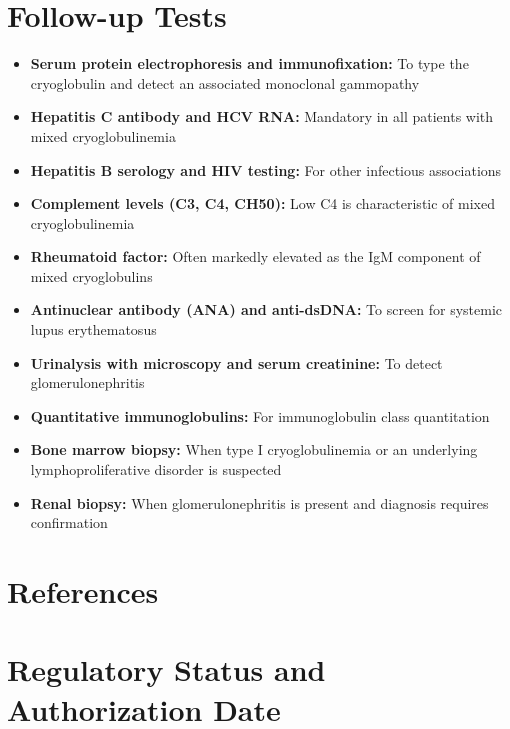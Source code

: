 \section*{Follow-up Tests}
\begin{itemize}
  \item \textbf{Serum protein electrophoresis and immunofixation:} To type the cryoglobulin and detect an associated monoclonal gammopathy
  \item \textbf{Hepatitis C antibody and HCV RNA:} Mandatory in all patients with mixed cryoglobulinemia
  \item \textbf{Hepatitis B serology and HIV testing:} For other infectious associations
  \item \textbf{Complement levels (C3, C4, CH50):} Low C4 is characteristic of mixed cryoglobulinemia
  \item \textbf{Rheumatoid factor:} Often markedly elevated as the IgM component of mixed cryoglobulins
  \item \textbf{Antinuclear antibody (ANA) and anti-dsDNA:} To screen for systemic lupus erythematosus
  \item \textbf{Urinalysis with microscopy and serum creatinine:} To detect glomerulonephritis
  \item \textbf{Quantitative immunoglobulins:} For immunoglobulin class quantitation
  \item \textbf{Bone marrow biopsy:} When type I cryoglobulinemia or an underlying lymphoproliferative disorder is suspected
  \item \textbf{Renal biopsy:} When glomerulonephritis is present and diagnosis requires confirmation
\end{itemize}

\section*{References}



\clearpage
\section*{Regulatory Status and Authorization Date}

\clearpage
